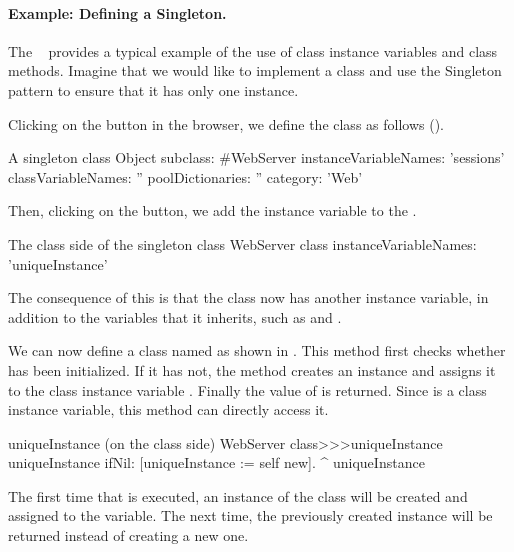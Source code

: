 \documentclass[a4paper,10pt,twoside]{book}
\begin{document}
\paragraph{Example: Defining a Singleton.}
The ~\cite{Alpe98a} provides a typical example of the use of class instance variables and class methods.
Imagine that we would like to implement a class  and use the Singleton pattern to ensure that it has only one instance.

Clicking on the  button in the browser, we define the class  as follows ().

\begin{classdef}[singleton]{A singleton class}
Object subclass: #WebServer
	instanceVariableNames: 'sessions' 	
	classVariableNames: '' 	
	poolDictionaries: '' 	
	category: 'Web'
\end{classdef}

Then, clicking on the  button, we add the instance variable  to the .

\begin{classdef}[webserver]{The class side of the singleton class}
WebServer class 	
	instanceVariableNames: 'uniqueInstance'
\end{classdef}

The consequence of this is that the class  now has another instance variable,
in addition to the variables that it inherits, such as  and .

We can now define a class  named  as shown in . 
This method first checks whether  has been initialized.
If it has not, the method creates an instance and assigns it to the class instance variable .  
Finally the value of  is returned.
Since  is a class instance variable, this method can directly access it.
    
\begin{method}[uniqueInstance]{uniqueInstance (on the class side)}
WebServer class>>>uniqueInstance
     uniqueInstance ifNil: [uniqueInstance := self new].
     ^ uniqueInstance
\end{method}

The first time that  is executed, an instance of the class  will be created and assigned to the  variable. 
The next time, the previously created instance will be returned instead of creating a new one. 
\end{document}
